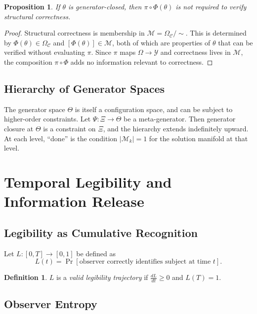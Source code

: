 \documentclass[12pt, twoside]{article}
\theoremstyle{plain}
\newtheorem{proposition}[theorem]{Proposition}
\theoremstyle{definition}
\newtheorem{definition}[theorem]{Definition}
\theoremstyle{remark}
\newcommand{\OmC}{\Omega_{\mathcal{C}}}
\begin{document}
\begin{proposition}
If $\theta$ is generator-closed, then $\pi \circ \Phi(\theta)$ is not required to verify structural correctness.
\end{proposition}

\begin{proof}
Structural correctness is membership in $\mathcal{M} = \OmC / {\sim}$. This is determined by $\Phi(\theta) \in \OmC$ and $[\Phi(\theta)] \in \mathcal{M}$, both of which are properties of $\theta$ that can be verified without evaluating $\pi$. Since $\pi$ maps $\Omega \to \mathcal{Y}$ and correctness lives in $\mathcal{M}$, the composition $\pi \circ \Phi$ adds no information relevant to correctness.
\end{proof}

\subsection{Hierarchy of Generator Spaces}

The generator space $\Theta$ is itself a configuration space, and can be subject to higher-order constraints. Let $\Psi : \Xi \to \Theta$ be a meta-generator. Then generator closure at $\Theta$ is a constraint on $\Xi$, and the hierarchy extends indefinitely upward. At each level, ``done'' is the condition $|\mathcal{M}_k| = 1$ for the solution manifold at that level.

\section{Temporal Legibility and Information Release}
\label{app:legibility}

\subsection{Legibility as Cumulative Recognition}

Let $L : [0, T] \to [0, 1]$ be defined as
\[
L(t) = \Pr[\text{observer correctly identifies subject at time } t].
\]

\begin{definition}
$L$ is a \emph{valid legibility trajectory} if $\frac{dL}{dt} \geq 0$ and $L(T) = 1$.
\end{definition}

\subsection{Observer Entropy}
\end{document}
